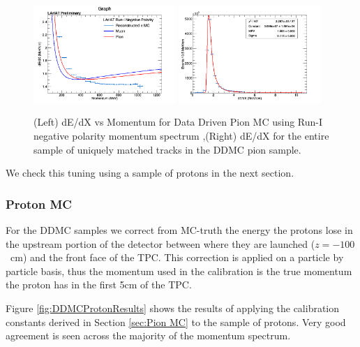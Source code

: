 \begin{figure}[htb]
\centering
\includegraphics[width=0.48\textwidth]{images/dEdXvsMomentumPionMCVeryFineBin.png}
\includegraphics[width=0.48\textwidth]{images/dEdXDDMCPionRunI.png}
\caption{(Left) dE/dX vs Momentum for Data Driven Pion MC using Run-I negative polarity momentum spectrum ,(Right) dE/dX for the entire sample of uniquely matched tracks in the DDMC pion sample.}
\label{fig:DDMCPionResults}
\end{figure}

We check this tuning using a sample of protons in the next section.

\subsubsection{Proton MC}\label{sec:Proton MC}

For the DDMC samples we correct from MC-truth the energy the protons lose in the upstream portion of the detector between where they are launched ($z=-100$~cm) and the front face of the TPC. This correction is applied on a particle by particle basis, thus the momentum used in the calibration is the true momentum the proton has in the first 5cm of the TPC.

Figure \ref{fig:DDMCProtonResults} shows the results of applying the calibration constants derived in Section \ref{sec:Pion MC} to the sample of protons. Very good agreement is seen across the majority of the momentum spectrum.


